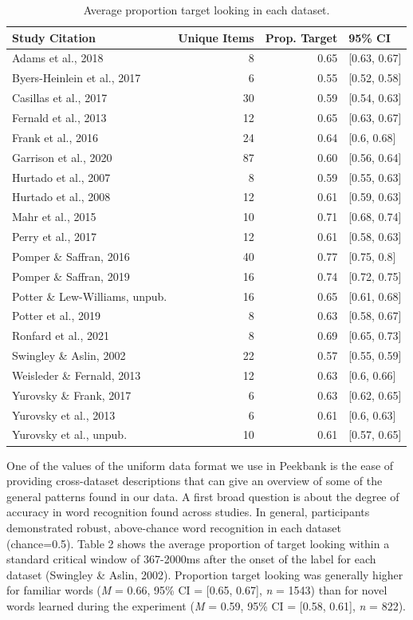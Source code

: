 \documentclass[
  english,
  man,floatsintext]{apa6}
\begin{document}
\begin{table}[H]
\centering
\begingroup\fontsize{9pt}{10pt}\selectfont
\begin{tabular}{lrrl}
  \hline
Study Citation & Unique Items & Prop. Target & 95\% CI \\ 
  \hline
Adams et al., 2018 & 8 & 0.65 & [0.63, 0.67] \\ 
  Byers-Heinlein et al., 2017 & 6 & 0.55 & [0.52, 0.58] \\ 
  Casillas et al., 2017 & 30 & 0.59 & [0.54, 0.63] \\ 
  Fernald et al., 2013 & 12 & 0.65 & [0.63, 0.67] \\ 
  Frank et al., 2016 & 24 & 0.64 & [0.6, 0.68] \\ 
  Garrison et al., 2020 & 87 & 0.60 & [0.56, 0.64] \\ 
  Hurtado et al., 2007 & 8 & 0.59 & [0.55, 0.63] \\ 
  Hurtado et al., 2008 & 12 & 0.61 & [0.59, 0.63] \\ 
  Mahr et al., 2015 & 10 & 0.71 & [0.68, 0.74] \\ 
  Perry et al., 2017 & 12 & 0.61 & [0.58, 0.63] \\ 
  Pomper \& Saffran, 2016 & 40 & 0.77 & [0.75, 0.8] \\ 
  Pomper \& Saffran, 2019 & 16 & 0.74 & [0.72, 0.75] \\ 
  Potter \& Lew-Williams, unpub. & 16 & 0.65 & [0.61, 0.68] \\ 
  Potter et al., 2019 & 8 & 0.63 & [0.58, 0.67] \\ 
  Ronfard et al., 2021 & 8 & 0.69 & [0.65, 0.73] \\ 
  Swingley \& Aslin, 2002 & 22 & 0.57 & [0.55, 0.59] \\ 
  Weisleder \& Fernald, 2013 & 12 & 0.63 & [0.6, 0.66] \\ 
  Yurovsky \& Frank, 2017 & 6 & 0.63 & [0.62, 0.65] \\ 
  Yurovsky et al., 2013 & 6 & 0.61 & [0.6, 0.63] \\ 
  Yurovsky et al., unpub. & 10 & 0.61 & [0.57, 0.65] \\ 
   \hline
\end{tabular}
\endgroup
\caption{Average proportion target looking in each dataset.} 
\end{table}

One of the values of the uniform data format we use in Peekbank is the ease of providing cross-dataset descriptions that can give an overview of some of the general patterns found in our data.
A first broad question is about the degree of accuracy in word recognition found across studies.
In general, participants demonstrated robust, above-chance word recognition in each dataset (chance=0.5).
Table 2 shows the average proportion of target looking within a standard critical window of 367-2000ms after the onset of the label for each dataset (Swingley \& Aslin, 2002).
Proportion target looking was generally higher for familiar words (\emph{M} = 0.66, 95\% CI = {[}0.65, 0.67{]}, \emph{n} = 1543) than for novel words learned during the experiment (\emph{M} = 0.59, 95\% CI = {[}0.58, 0.61{]}, \emph{n} = 822).
\end{document}
